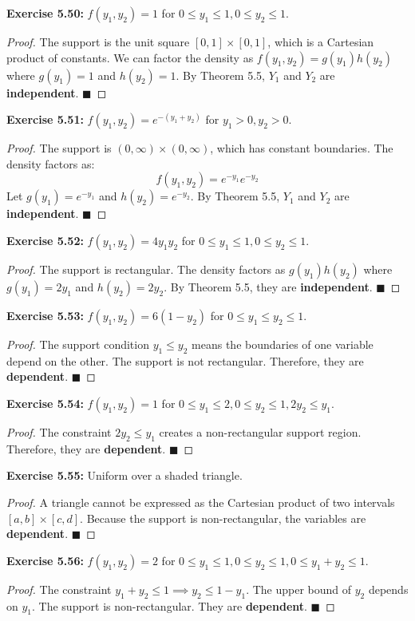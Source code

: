 \documentclass[11pt, a4paper]{article}
\theoremstyle{definition}
\theoremstyle{remark}
\begin{document}
\textbf{Exercise 5.50:} $f(y_1, y_2) = 1$ for $0 \le y_1 \le 1, 0 \le y_2 \le 1$.
\begin{proof}
The support is the unit square $[0,1] \times [0,1]$, which is a Cartesian product of constants. We can factor the density as $f(y_1, y_2) = g(y_1)h(y_2)$ where $g(y_1) = 1$ and $h(y_2) = 1$. By Theorem 5.5, $Y_1$ and $Y_2$ are \textbf{independent}. $\blacksquare$
\end{proof}

\textbf{Exercise 5.51:} $f(y_1, y_2) = e^{-(y_1+y_2)}$ for $y_1 > 0, y_2 > 0$.
\begin{proof}
The support is $(0, \infty) \times (0, \infty)$, which has constant boundaries. The density factors as:
\[ f(y_1, y_2) = e^{-y_1} e^{-y_2} \]
Let $g(y_1) = e^{-y_1}$ and $h(y_2) = e^{-y_2}$. By Theorem 5.5, $Y_1$ and $Y_2$ are \textbf{independent}. $\blacksquare$
\end{proof}

\textbf{Exercise 5.52:} $f(y_1, y_2) = 4y_1 y_2$ for $0 \le y_1 \le 1, 0 \le y_2 \le 1$.
\begin{proof}
The support is rectangular. The density factors as $g(y_1)h(y_2)$ where $g(y_1) = 2y_1$ and $h(y_2) = 2y_2$. By Theorem 5.5, they are \textbf{independent}. $\blacksquare$
\end{proof}

\textbf{Exercise 5.53:} $f(y_1, y_2) = 6(1-y_2)$ for $0 \le y_1 \le y_2 \le 1$.
\begin{proof}
The support condition $y_1 \le y_2$ means the boundaries of one variable depend on the other. The support is not rectangular. Therefore, they are \textbf{dependent}. $\blacksquare$
\end{proof}

\textbf{Exercise 5.54:} $f(y_1, y_2) = 1$ for $0 \le y_1 \le 2, 0 \le y_2 \le 1, 2y_2 \le y_1$.
\begin{proof}
The constraint $2y_2 \le y_1$ creates a non-rectangular support region. Therefore, they are \textbf{dependent}. $\blacksquare$
\end{proof}

\textbf{Exercise 5.55:} Uniform over a shaded triangle.
\begin{proof}
A triangle cannot be expressed as the Cartesian product of two intervals $[a,b] \times [c,d]$. Because the support is non-rectangular, the variables are \textbf{dependent}. $\blacksquare$
\end{proof}

\textbf{Exercise 5.56:} $f(y_1, y_2) = 2$ for $0 \le y_1 \le 1, 0 \le y_2 \le 1, 0 \le y_1+y_2 \le 1$.
\begin{proof}
The constraint $y_1 + y_2 \le 1 \implies y_2 \le 1 - y_1$. The upper bound of $y_2$ depends on $y_1$. The support is non-rectangular. They are \textbf{dependent}. $\blacksquare$
\end{proof}
\end{document}
